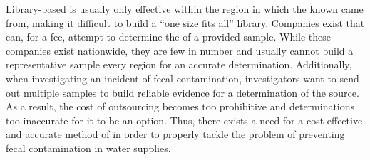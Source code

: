 Library-based \mst{} is usually only effective within the region in which the known\spec{} \isols{} came from, making it difficult to build a ``one size fits all'' library.
Companies exist that can, for a fee, attempt to determine the \spec{} of a provided sample.
While these companies exist nationwide, they are few in number and usually cannot build a representative sample every region for an accurate determination.
Additionally, when investigating an incident of fecal contamination, investigators want to send out multiple samples to build reliable evidence for a determination of the source.
As a result, the cost of outsourcing becomes too prohibitive and determinations too inaccurate for it to be an option.
Thus, there exists a need for a cost-effective and accurate method of \mst{} in order to properly tackle the problem of preventing fecal contamination in water supplies.



